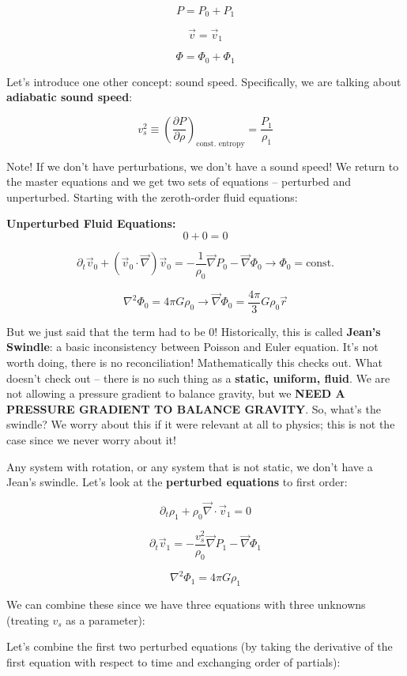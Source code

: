 \documentclass{article}
\newcommand{\be}{\begin{equation}}
\newcommand{\ee}{\end{equation}}
\begin{document}
\be
P = P_0 + P_1
\ee

\be
\vec{v} = \vec{v}_1
\ee

\be
\Phi = \Phi_0 + \Phi_1
\ee

Let's introduce one other concept: sound speed. Specifically, we are talking about \textbf{adiabatic sound speed}:

\be
v_s^2 \equiv \left(\frac{\partial P}{\partial \rho}\right)_\text{const. entropy} = \frac{P_1}{\rho_1}
\ee

Note! If we don't have perturbations, we don't have a sound speed! We return to the master equations and we get two sets of equations -- perturbed and unperturbed. Starting with the zeroth-order fluid equations:

\noindent\textbf{Unperturbed Fluid Equations:}
\be
0 + 0 = 0
\ee

\be
\partial_t \vec{v}_0 + \left(\vec{v}_0 \cdot \vec{\nabla}\right)\vec{v}_0 = -\frac{1}{\rho_0} \vec{\nabla}P_0 - \vec{\nabla}\Phi_0 \rightarrow \Phi_0 = \text{const.}
\ee

\be
\nabla^2 \Phi_0 = 4\pi G\rho_0 \rightarrow \vec{\nabla} \Phi_0 = \frac{4\pi}{3} G\rho_0 \vec{r}
\ee

But we just said that the term had to be $0$! Historically, this is called \textbf{Jean's Swindle}: a basic inconsistency between Poisson and Euler equation. It's not worth doing, there is no reconciliation! Mathematically this checks out. What doesn't check out -- there is no such thing as a \textbf{static, uniform, fluid}. We are not allowing a pressure gradient to balance gravity, but we \textbf{NEED A PRESSURE GRADIENT TO BALANCE GRAVITY}. So, what's the swindle? We worry about this if it were relevant at all to physics; this is not the case since we never worry about it!

Any system with rotation, or any system that is not static, we don't have a Jean's swindle. Let's look at the \textbf{perturbed equations} to first order:

\be
\partial_t \rho_1 + \rho_0\vec{\nabla} \cdot \vec{v}_1 = 0
\ee

\be
\partial_t \vec{v}_1 = -\frac{v_s^2}{\rho_0}\vec{\nabla}P_1 - \vec{\nabla} \Phi_1
\ee

\be
\nabla^2 \Phi_1 = 4\pi G \rho_1
\ee

We can combine these since we have three equations with three unknowns (treating $v_s$ as a parameter):

Let's combine the first two perturbed equations (by taking the derivative of the first equation with respect to time and exchanging order of partials):
\end{document}
